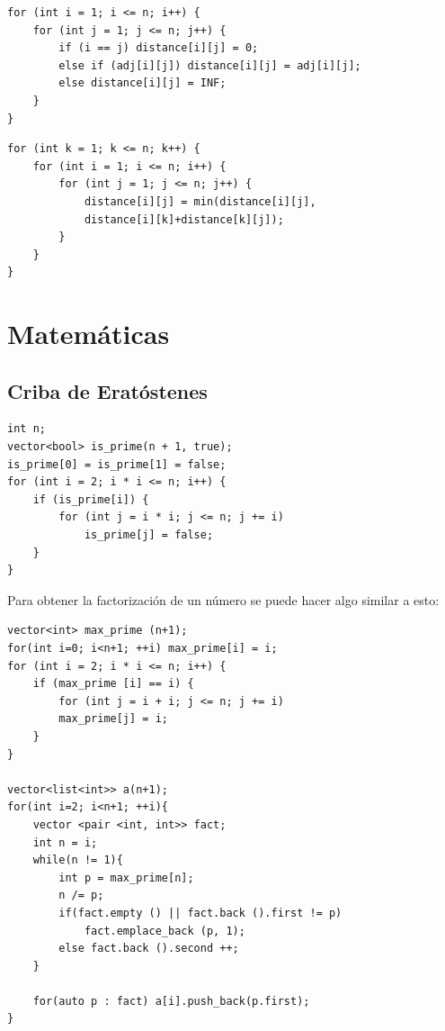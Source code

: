 \documentclass[11 pt]{article}
\begin{document}
\begin{verbatim}
for (int i = 1; i <= n; i++) {
    for (int j = 1; j <= n; j++) {
        if (i == j) distance[i][j] = 0;
        else if (adj[i][j]) distance[i][j] = adj[i][j];
        else distance[i][j] = INF;
    }
}
\end{verbatim}


\begin{verbatim}
for (int k = 1; k <= n; k++) {
    for (int i = 1; i <= n; i++) {
        for (int j = 1; j <= n; j++) {
            distance[i][j] = min(distance[i][j],
            distance[i][k]+distance[k][j]);
        }
    }
}
\end{verbatim}

\vspace{25 px}
\section{Matemáticas}
\subsection{Criba de Eratóstenes}

\begin{verbatim}
int n;
vector<bool> is_prime(n + 1, true);
is_prime[0] = is_prime[1] = false;
for (int i = 2; i * i <= n; i++) {
    if (is_prime[i]) {
        for (int j = i * i; j <= n; j += i)
            is_prime[j] = false;
    }
}
\end{verbatim}

Para obtener la factorización de un número se puede hacer algo similar a esto:
\begin{verbatim}
vector<int> max_prime (n+1);
for(int i=0; i<n+1; ++i) max_prime[i] = i;
for (int i = 2; i * i <= n; i++) {
    if (max_prime [i] == i) {
        for (int j = i + i; j <= n; j += i)
        max_prime[j] = i;
    }
}

vector<list<int>> a(n+1);
for(int i=2; i<n+1; ++i){
    vector <pair <int, int>> fact;
    int n = i;
    while(n != 1){
        int p = max_prime[n];
        n /= p;
        if(fact.empty () || fact.back ().first != p)
            fact.emplace_back (p, 1);
        else fact.back ().second ++;
    }

    for(auto p : fact) a[i].push_back(p.first);
}
\end{verbatim}
\end{document}
